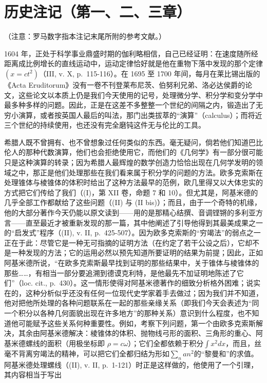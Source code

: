 \section*{历史注记（第一、二、三章）}
{}

（注意：罗马数字指本注记末尾所附的参考文献。）

1604 年，正处于科学事业鼎盛时期的伽利略相信，自己已经证明：在速度随所经距离成比例增长的直线运动中，运动定律恰好就是他在重物下落中发现的那个定律\((x = ct^{2})\)（III, v. X, p.~115-116）。在 1695 至 1700 年间，每月在莱比锡出版的《Acta Eruditorum》没有一卷不刊登莱布尼茨、伯努利兄弟、洛必达侯爵的论文，这些论文以本质上仍是我们今天使用的记号，处理微分学、积分学和变分学中最多种多样的问题。因此，正是在这差不多整整一个世纪的间隔之内，锻造出了无穷小演算，或者按英国人最后的叫法，那门出类拔萃的“演算”（calculus）；而将近三个世纪的持续使用，也还没有完全磨钝这件无与伦比的工具。

希腊人既不曾拥有、也不曾想象过任何类似的东西。毫无疑问，倘若他们知道巴比伦人的那种代数演算，他们也会拒绝使用它，而他们的《几何学》有一部分很可能只是这种演算的转录；因为希腊人最辉煌的数学创造力恰恰出现在几何学发明的领域之中，那正是他们处理那些在我们看来属于积分学的问题的方法。欧多克索斯在处理锥体与棱锥体的体积时给出了这种方法最早的范例，欧几里得又以大体忠实的方式把它们传给了我们（(I)，第 XII 卷，命题 7 和 10）。但尤其是，阿基米德的几乎全部工作都献给了这些问题（(II) 与 (II bis)）；而且，由于一个奇特的机缘，他的大部分著作今天仍能以原文读到——用的是那精心结撰、音调铿锵的多利亚方言——直至最近才被重新发现的那一篇，其中他阐述了引导他得到其最美成果之一的“启发式”程序（(II), v. II, p.~425-507）。因为欧多克索斯的“穷竭法”的弱点之一正在于此：尽管它是一种无可指摘的证明方法（在约定了若干公设之后），它却不是一种发现的方法；它的运用必然以预先知道所要证明的结果为前提；因此，正如阿基米德所说，“在欧多克索斯最早找到证明的那些结果中，关于锥体与棱锥体的那些……，有相当一部分要追溯到德谟克利特，是他最先不加证明地陈述了它们”（loc. cit., p.~430）。这一情形使得对阿基米德著作的细致分析格外困难；说实在的，这种分析似乎还没有任何一位现代史学家着手去做过；因为我们并不知道，他对把他所处理的各种问题联系在一起的那些亲缘关系（即我们今天会表述为“同一个积分以各种几何面貌出现在许多地方”的那种关系）意识到什么程度，也不知道他可能赋予这些关系何种重要性。例如，考察下列问题，第一个由欧多克索斯解决，其余由阿基米德解决：棱锥体的体积、抛物线弓形的面积、三角形的重心、阿基米德螺线的面积（用极坐标即 \(\rho = c\omega\)）；它们全都依赖于积分\(\int x^2 dx\)，而且，丝毫不背离穷竭法的精神，可以把它们全都归结为形如\(\sum_{n} an^2\)的“黎曼和”的求值。阿基米德处理螺线（(II), v. II, p.~1-121）时正是这样做的，他使用了一个引理，其内容相当于写出


